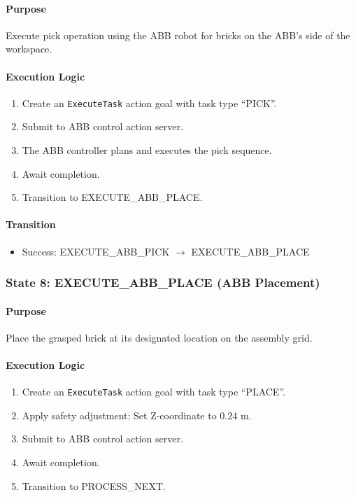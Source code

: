 \paragraph{Purpose}

Execute pick operation using the ABB robot for bricks on the ABB's side of the workspace.

\paragraph{Execution Logic}

\begin{enumerate}
    \item Create an \texttt{ExecuteTask} action goal with task type ``PICK''.
    \item Submit to ABB control action server.
    \item The ABB controller plans and executes the pick sequence.
    \item Await completion.
    \item Transition to EXECUTE\_ABB\_PLACE.
\end{enumerate}

\paragraph{Transition}

\begin{itemize}
    \item Success: EXECUTE\_ABB\_PICK $\rightarrow$ EXECUTE\_ABB\_PLACE
\end{itemize}

\subsubsection{State 8: EXECUTE\_ABB\_PLACE (ABB Placement)}
\label{state:executeABBplace}

\paragraph{Purpose}

Place the grasped brick at its designated location on the assembly grid.

\paragraph{Execution Logic}

\begin{enumerate}
    \item Create an \texttt{ExecuteTask} action goal with task type ``PLACE''.
    \item Apply safety adjustment: Set Z-coordinate to 0.24 m.
    \item Submit to ABB control action server.
    \item Await completion.
    \item Transition to PROCESS\_NEXT.
\end{enumerate}

